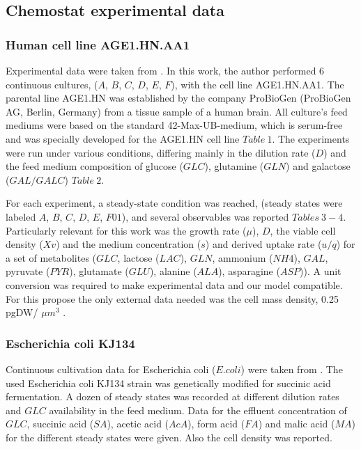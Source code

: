 \subsection{Chemostat experimental data} 

\subsubsection{Human cell line AGE1.HN.AA1} 
	Experimental data were taken from . In this work, the author performed 6 continuous cultures, ($A$, $B$, $C$, $D$, $E$, $F$), with the cell line AGE1.HN.AA1. The parental line AGE1.HN was established by the company ProBioGen (ProBioGen AG, Berlin, Germany) from a tissue sample of a human brain. All culture's feed mediums were based on the standard 42-Max-UB-medium, which is serum-free and was specially developed for the AGE1.HN cell line $Table\ 1$. The experiments were run under various conditions, differing mainly in the dilution rate ($D$) and the feed medium composition of glucose ($GLC$), glutamine ($GLN$) and galactose ($GAL/GALC$) $Table\ 2$.
	
	For each experiment, a steady-state condition was reached, (steady states were labeled $A$, $B$, $C$, $D$, $E$, $F01$), and several observables  was reported $Tables\ 3-4$. Particularly relevant for this work was the growth rate ($\mu$), $D$, the viable cell density ($Xv$) and the medium concentration ($s$) and derived uptake rate ($u/q$) for a set of metabolites ($GLC$, lactose ($LAC$), $GLN$, ammonium ($NH4$), $GAL$, pyruvate ($PYR$), glutamate ($GLU$), alanine ($ALA$), asparagine ($ASP$)). A unit conversion was required to make experimental data and our model compatible. For this propose the only external data needed was the cell mass density, 0.25 pgDW/ $\mu$$m^3$ .
	
	
\subsubsection{Escherichia coli KJ134} 
	Continuous cultivation data for Escherichia coli ($E. coli$) were taken from . The used Escherichia coli KJ134 strain was genetically modified for succinic acid fermentation. A dozen of steady states was recorded at different dilution rates and $GLC$ availability in the feed medium. Data for the effluent concentration of $GLC$, succinic acid ($SA$), acetic acid ($AcA$), form acid ($FA$) and malic acid ($MA$) for the different steady states were given. Also the cell density was reported.